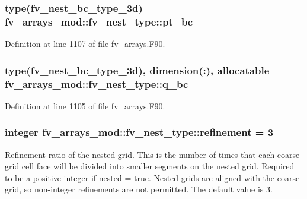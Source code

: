 \subsubsection[{pt\-\_\-bc}]{\setlength{\rightskip}{0pt plus 5cm}type({\bf fv\-\_\-nest\-\_\-bc\-\_\-type\-\_\-3d}) fv\-\_\-arrays\-\_\-mod\-::fv\-\_\-nest\-\_\-type\-::pt\-\_\-bc}\label{structfv__arrays__mod_1_1fv__nest__type_a94b7a20dbb7ee4b45a205c3ca3dd2e8c}


Definition at line 1107 of file fv\-\_\-arrays.\-F90.

\subsubsection[{q\-\_\-bc}]{\setlength{\rightskip}{0pt plus 5cm}type({\bf fv\-\_\-nest\-\_\-bc\-\_\-type\-\_\-3d}), dimension(\-:), allocatable fv\-\_\-arrays\-\_\-mod\-::fv\-\_\-nest\-\_\-type\-::q\-\_\-bc}\label{structfv__arrays__mod_1_1fv__nest__type_a79129035b599fe5d20157b044275ce39}


Definition at line 1105 of file fv\-\_\-arrays.\-F90.

\subsubsection[{refinement}]{\setlength{\rightskip}{0pt plus 5cm}integer fv\-\_\-arrays\-\_\-mod\-::fv\-\_\-nest\-\_\-type\-::refinement = 3}\label{structfv__arrays__mod_1_1fv__nest__type_abd58583303d5bb884b9b12a981ff5134}


Refinement ratio of the nested grid. This is the number of times that each coarse-\/grid cell face will be divided into smaller segments on the nested grid. Required to be a positive integer if nested = true. Nested grids are aligned with the coarse grid, so non-\/integer refinements are not permitted. The default value is 3. 



